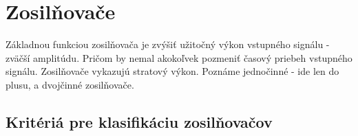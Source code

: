 \chapter{Zosilňovače}

Základnou funkciou zosilňovača je zvýšiť užitočný výkon vstupného signálu - zväčší amplitúdu. Pričom by nemal akokoľvek pozmeniť časový priebeh vstupného signálu. Zosilňovače vykazujú stratový výkon. Poznáme jednočinné - ide len do plusu, a dvojčinné zosilňovače.
\section{Kritériá pre klasifikáciu zosilňovačov}
